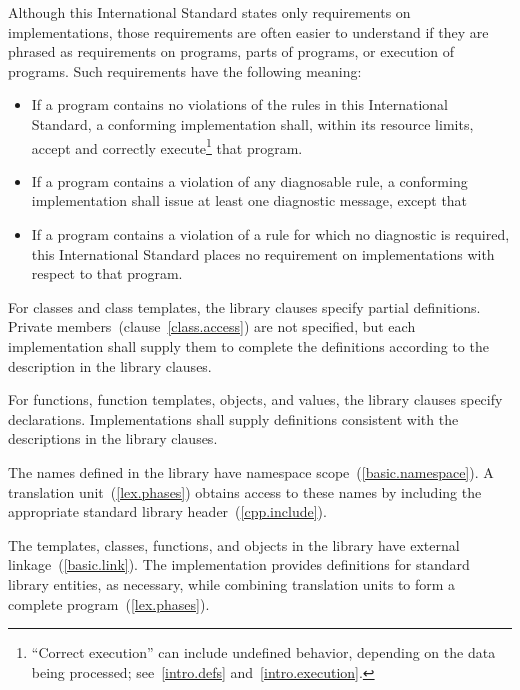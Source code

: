\pnum
{}%
Although this International Standard states only requirements on \Cpp
implementations, those requirements are often easier to understand if
they are phrased as requirements on programs, parts of programs, or
execution of programs. Such requirements have the following meaning:
\begin{itemize}

\item
If a program contains no violations of the rules in this
International Standard, a conforming implementation shall,
within its resource limits, accept and correctly execute\footnote{``Correct execution'' can include undefined behavior, depending on
the data being processed; see~\ref{intro.defs} and~\ref{intro.execution}.}
that program.

\item
{}%
If a program contains a violation of any diagnosable rule,
a conforming implementation
shall issue at least one diagnostic message, except that

\item
{}%
If a program contains a violation of a rule for which no diagnostic
is required, this International Standard places no requirement on
implementations with respect to that program.

\end{itemize}

\pnum
{}%
%
%
For classes and class templates, the library clauses specify partial
definitions. Private members~(clause~\ref{class.access}) are not
specified, but each implementation shall supply them to complete the
definitions according to the description in the library clauses.

\pnum
For functions, function templates, objects, and values, the library
clauses specify declarations. Implementations shall supply definitions
consistent with the descriptions in the library clauses.

\pnum
The names defined in the library have namespace
scope~(\ref{basic.namespace}). A \Cpp  translation
unit~(\ref{lex.phases}) obtains access to these names by including the
appropriate standard library header~(\ref{cpp.include}).

\pnum
The templates, classes, functions, and objects in the library have
external linkage~(\ref{basic.link}). The implementation provides
definitions for standard library entities, as necessary, while combining
translation units to form a complete \Cpp  program~(\ref{lex.phases}).%

